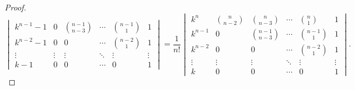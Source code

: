 \documentclass[class=linearalgebra,crop=false]{standalone}
\begin{document}
\begin{proof}
\[\begin{vmatrix}
            k^{n-1} - 1 & 0              & \binom{n-1}{n-3} & \cdots & \binom{n-1}{1} & 1      \\
            k^{n-2} - 1 & 0              & 0                & \cdots & \binom{n-2}{1} & 1      \\
            \vdots      & \vdots         & \vdots           & \ddots & \vdots         & \vdots \\
            k - 1       & 0              & 0                & \cdots & 0              & 1
        \end{vmatrix}
        = \dfrac{1}{n!}
        \begin{vmatrix}
            k^{n}   & \binom{n}{n-2} & \binom{n}{n-3}   & \cdots & \binom{n}{1}   & 1      \\
            k^{n-1} & 0              & \binom{n-1}{n-3} & \cdots & \binom{n-1}{1} & 1      \\
            k^{n-2} & 0              & 0                & \cdots & \binom{n-2}{1} & 1      \\
            \vdots  & \vdots         & \vdots           & \ddots & \vdots         & \vdots \\
            k       & 0              & 0                & \cdots & 0              & 1
        \end{vmatrix}.
    \]
\end{proof}
\end{document}
